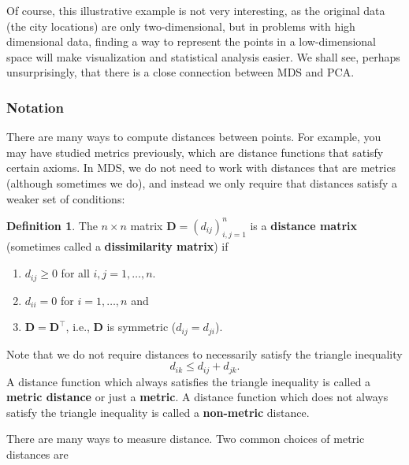 \documentclass[]{book}
\providecommand{\tightlist}{%
  \setlength{\itemsep}{0pt}\setlength{\parskip}{0pt}}
\theoremstyle{definition}
\newtheorem{definition}{Definition}[chapter]
\theoremstyle{definition}
\theoremstyle{definition}
\theoremstyle{remark}
\begin{document}
Of course, this illustrative example is not very interesting, as the original data (the city locations) are only two-dimensional, but in problems with high dimensional data, finding a way to
represent the points in a low-dimensional space will make visualization and statistical analysis easier. We shall see, perhaps unsurprisingly, that there is a close connection between MDS and PCA.

\hypertarget{notation-2}{%
\subsubsection*{Notation}\label{notation-2}}

There are many ways to compute distances between points. For example, you may have studied metrics previously, which are distance functions that satisfy certain axioms. In MDS, we do not need to work with distances that are metrics (although sometimes we do), and instead we only require that distances satisfy a weaker set of conditions:

\begin{definition}
\protect\hypertarget{def:distanceD}{}{\label{def:distanceD} }The \(n \times n\) matrix \(\mathbf D=(d_{ij})_{i,j=1}^n\) is a \textbf{distance matrix} (sometimes called a \textbf{dissimilarity matrix}) if

\begin{enumerate}
\def\labelenumi{\arabic{enumi}.}
\tightlist
\item
  \(d_{ij}\geq 0\) for all \(i, j=1,\ldots,n\).
\item
  \(d_{ii}=0\) for \(i=1,\ldots, n\) and
\item
  \(\mathbf D=\mathbf D^\top\), i.e., \(\mathbf D\) is symmetric (\(d_{ij}=d_{ji}\)).
   
\end{enumerate}
\end{definition}

Note that we do not require distances to necessarily satisfy the triangle inequality
\begin{equation}
d_{ik} \leq d_{ij}+d_{jk}.
\label{eq:triangle}
\end{equation}
A distance function which always satisfies the triangle inequality is called a \textbf{metric distance}
or just a \textbf{metric}. A distance function which does not always satisfy the triangle inequality is called a
\textbf{non-metric} distance.

There are many ways to measure distance. Two common choices of metric distances are
\end{document}
